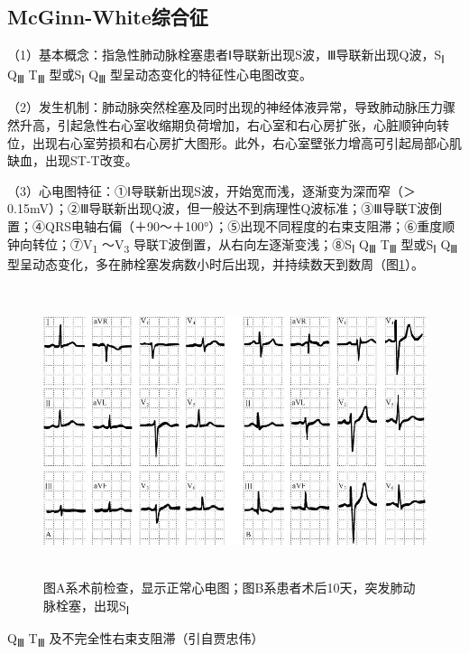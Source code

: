 \subsection{McGinn-White综合征}

（1）基本概念：指急性肺动脉栓塞患者Ⅰ导联新出现S波，Ⅲ导联新出现Q波，S\textsubscript{Ⅰ}
Q\textsubscript{Ⅲ} T\textsubscript{Ⅲ} 型或S\textsubscript{Ⅰ}
Q\textsubscript{Ⅲ} 型呈动态变化的特征性心电图改变。

（2）发生机制：肺动脉突然栓塞及同时出现的神经体液异常，导致肺动脉压力骤然升高，引起急性右心室收缩期负荷增加，右心室和右心房扩张，心脏顺钟向转位，出现右心室劳损和右心房扩大图形。此外，右心室壁张力增高可引起局部心肌缺血，出现ST-T改变。

（3）心电图特征：①Ⅰ导联新出现S波，开始宽而浅，逐渐变为深而窄（＞0.15mV）；②Ⅲ导联新出现Q波，但一般达不到病理性Q波标准；③Ⅲ导联T波倒置；④QRS电轴右偏（＋90～＋100°）；⑤出现不同程度的右束支阻滞；⑥重度顺钟向转位；⑦V\textsubscript{1}
～V\textsubscript{3} 导联T波倒置，从右向左逐渐变浅；⑧S\textsubscript{Ⅰ}
Q\textsubscript{Ⅲ} T\textsubscript{Ⅲ} 型或S\textsubscript{Ⅰ}
Q\textsubscript{Ⅲ}
型呈动态变化，多在肺栓塞发病数小时后出现，并持续数天到数周（图\ref{fig40-19}）。

\begin{figure}[!htbp]
 \centering
 \includegraphics[width=5.58333in,height=3.33333in]{./images/Image00681.jpg}
 \captionsetup{justification=centering}
 \caption{图A系术前检查，显示正常心电图；图B系患者术后10天，突发肺动脉栓塞，出现S\textsubscript{Ⅰ}}
 \label{fig40-19}
  \end{figure} 
Q\textsubscript{Ⅲ} T\textsubscript{Ⅲ} 及不完全性右束支阻滞（引自贾忠伟）

\protect\hypertarget{text00047.htmlux5cux23subid578}{}{}

